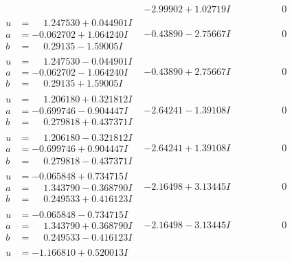 \documentclass[1p]{elsarticle_modified}
\theoremstyle{definition}
\begin{document}
$$\begin{array}{c|c|c}
 & -2.99902 + 1.02719 I & \phantom{-0.000000 } 0 \\ \hline\begin{aligned}
u &= \phantom{-}1.247530 + 0.044901 I \\
a &= -0.062702 + 1.064240 I \\
b &= \phantom{-}0.29135 - 1.59005 I\end{aligned}
 & -0.43890 - 2.75667 I & \phantom{-0.000000 } 0 \\ \hline\begin{aligned}
u &= \phantom{-}1.247530 - 0.044901 I \\
a &= -0.062702 - 1.064240 I \\
b &= \phantom{-}0.29135 + 1.59005 I\end{aligned}
 & -0.43890 + 2.75667 I & \phantom{-0.000000 } 0 \\ \hline\begin{aligned}
u &= \phantom{-}1.206180 + 0.321812 I \\
a &= -0.699746 - 0.904447 I \\
b &= \phantom{-}0.279818 + 0.437371 I\end{aligned}
 & -2.64241 - 1.39108 I & \phantom{-0.000000 } 0 \\ \hline\begin{aligned}
u &= \phantom{-}1.206180 - 0.321812 I \\
a &= -0.699746 + 0.904447 I \\
b &= \phantom{-}0.279818 - 0.437371 I\end{aligned}
 & -2.64241 + 1.39108 I & \phantom{-0.000000 } 0 \\ \hline\begin{aligned}
u &= -0.065848 + 0.734715 I \\
a &= \phantom{-}1.343790 - 0.368790 I \\
b &= \phantom{-}0.249533 + 0.416123 I\end{aligned}
 & -2.16498 + 3.13445 I & \phantom{-0.000000 } 0 \\ \hline\begin{aligned}
u &= -0.065848 - 0.734715 I \\
a &= \phantom{-}1.343790 + 0.368790 I \\
b &= \phantom{-}0.249533 - 0.416123 I\end{aligned}
 & -2.16498 - 3.13445 I & \phantom{-0.000000 } 0 \\ \hline\begin{aligned}
u &= -1.166810 + 0.520013 I \\

\end{aligned}
\end{array}$$
\end{document}
